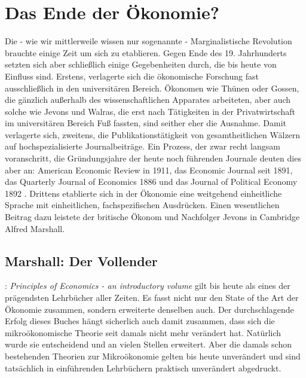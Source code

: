 %
%
%

\chapter{Das Ende der Ökonomie?}
\label{Neoklassik}

Die - wie wir mittlerweile wissen nur sogenannte - Marginalistische Revolution brauchte einige Zeit um sich zu etablieren. Gegen Ende des 19. Jahrhunderts setzten sich aber schließlich einige Gegebenheiten durch, die bis heute von Einfluss sind. Erstens, verlagerte sich die ökonomische Forschung fast ausschließlich in den universitären Bereich. Ökonomen wie Thünen oder Gossen, die gänzlich außerhalb des wissenschaftlichen Apparates arbeiteten, aber auch solche wie Jevons und Walras, die erst nach Tätigkeiten in der Privatwirtschaft im universitären Bereich Fuß fassten, sind seither eher die Ausnahme. Damit verlagerte sich, zweitens, die Publikationstätigkeit von gesamtheitlichen Wälzern auf hochspezialisierte Journalbeiträge. Ein Prozess, der zwar recht langsam voranschritt, die Gründungsjahre der heute noch führenden Journale deuten dies aber an: American Economic Review in 1911, das Economic Journal seit 1891, das Quarterly Journal of Economics 1886 und das Journal of Political Economy 1892 \parencite[S. 340]{Rosner2012}.
Drittens etablierte sich in der Ökonomie eine weitgehend einheitliche Sprache mit einheitlichen, fachspezifischen Ausdrücken. Einen wesentlichen Beitrag dazu leistete der britische Ökonom und Nachfolger Jevons in Cambridge Alfred Marshall.

\section{Marshall: Der Vollender}

\textcite{Marshall1890}: \textit{Principles of Economics - an introductory volume} gilt bis heute als eines der prägendsten Lehrbücher aller Zeiten. Es fasst nicht nur den State of the Art der Ökonomie zusammen, sondern erweiterte denselben auch. Der durchschlagende Erfolg dieses Buches hängt sicherlich auch damit zusammen, dass sich die mikroökonomische Theorie seit damals nicht mehr verändert hat. Natürlich wurde sie entscheidend und an vielen Stellen erweitert. Aber die damals schon bestehenden Theorien zur Mikroökonomie gelten bis heute unverändert und sind tatsächlich in einführenden Lehrbüchern praktisch unverändert abgedruckt.

